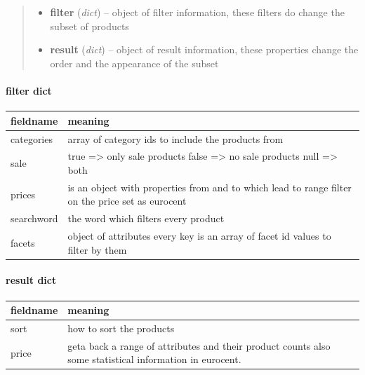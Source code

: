 \documentclass[letterpaper,10pt,english]{sphinxmanual}
\begin{document}
\begin{fulllineitems}
\begin{fulllineitems}
\begin{quote}
\begin{description}
\begin{itemize}
\item {} 
\textbf{filter} (\emph{dict}) -- object of filter information, these filters do
change the subset of products

\item {} 
\textbf{result} (\emph{dict}) -- object of result information, these properties
change the order and the appearance of the subset

\end{itemize}

\end{description}\end{quote}
\paragraph{filter dict}

\begin{tabulary}{\linewidth}{|L|L|}
\hline
\textsf{\relax 
fieldname
} & \textsf{\relax 
meaning
}\\
\hline
categories
 & 
array of category ids to include the products from
\\

sale
 & 
true =\textgreater{} only sale products
false =\textgreater{} no sale products
null =\textgreater{} both
\\

prices
 & 
is an object with properties from and to which lead to
range filter on the price set as eurocent
\\

searchword
 & 
the word which filters every product
\\

facets
 & 
object of attributes every key is an array of facet id
values to filter by them
\\
\hline\end{tabulary}

\paragraph{result dict}

\begin{tabulary}{\linewidth}{|L|L|}
\hline
\textsf{\relax 
fieldname
} & \textsf{\relax 
meaning
}\\
\hline
sort
 & 
how to sort the products
\\

price
 & 
geta back a range of attributes and their product counts
also some statistical information in eurocent.
\\


\end{tabulary}
\end{fulllineitems}
\end{fulllineitems}
\end{document}
